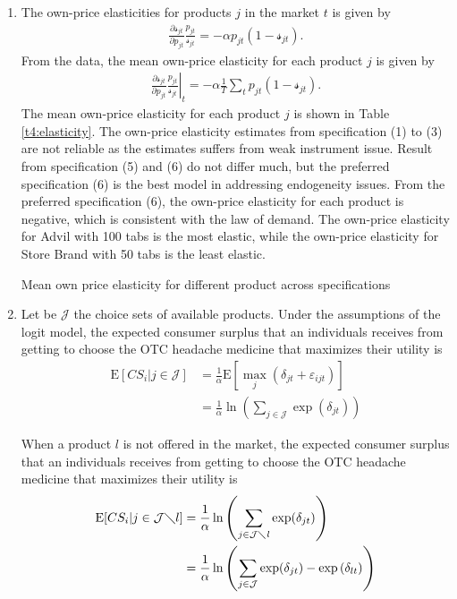 \documentclass{article}
\newcommand{\E}{\text{E}}
\begin{document}
\begin{enumerate}
\item The own-price elasticities for products $j$ in the market $t$ is given by
\begin{align*}
    \frac{\partial\mathcal{s}_{jt}}{\partial p_{jt}}\frac{p_{jt}}{\mathcal{s}_{jt}}=-\alpha p_{jt}(1-\mathcal{s}_{jt}).
\end{align*}
From the data, the mean own-price elasticity for each product $j$ is given by
\begin{align*}
    \left.\frac{\partial\mathcal{s}_{jt}}{\partial p_{jt}}\frac{p_{jt}}{\mathcal{s}_{jt}}\right\vert_t=-\alpha \frac{1}{T}\sum_{t}p_{jt}(1-\mathcal{s}_{jt}).
\end{align*}
The mean own-price elasticity for each product $j$ is shown in Table \ref{t4:elasticity}. The own-price elasticity estimates from specification (1) to (3) are not reliable as the estimates suffers from weak instrument issue. Result from specification (5) and (6) do not differ much, but the preferred specification (6) is the best model in addressing endogeneity issues. From the preferred specification (6), the own-price elasticity for each product is negative, which is consistent with the law of demand. The own-price elasticity for Advil with 100 tabs is the most elastic, while the own-price elasticity for Store Brand with 50 tabs is the least elastic. 

\begin{table}[H]
\centering
\caption{Mean own price elasticity for different product across specifications}\label{t4:elasticity}
\begin{threeparttable}

\end{threeparttable}
\end{table}

\item Let be $\mathcal{J}$ the choice sets of available products. Under the assumptions of the logit model, the expected consumer surplus that an individuals receives
from getting to choose the OTC headache medicine that maximizes their utility is
\begin{align*}
\E[CS_i|j\in \mathcal{J}]&=\frac{1}{\alpha} \E[\max_j (\delta_{jt}+\varepsilon_{ijt})]\\
&=\frac{1}{\alpha} \ln\left(\sum_{j\in \mathcal{J}}\exp(\delta_{jt})\right)
\end{align*}

When a product $l$ is not offered in the market, the expected consumer surplus that an individuals receives from getting to choose the OTC headache medicine that maximizes their utility is
\begin{align*}
    \E[CS_i|j\in \mathcal{J}\diagdown l]&=\frac{1}{\alpha} \ln\left(\sum_{j\in \mathcal{J}\diagdown l}\exp(\delta_{jt})\right)\\
    &=\frac{1}{\alpha} \ln\left(\sum_{j\in \mathcal{J}}\exp(\delta_{jt})-\exp{(\delta_{lt})}\right)
\end{align*}


\end{enumerate}
\end{document}
